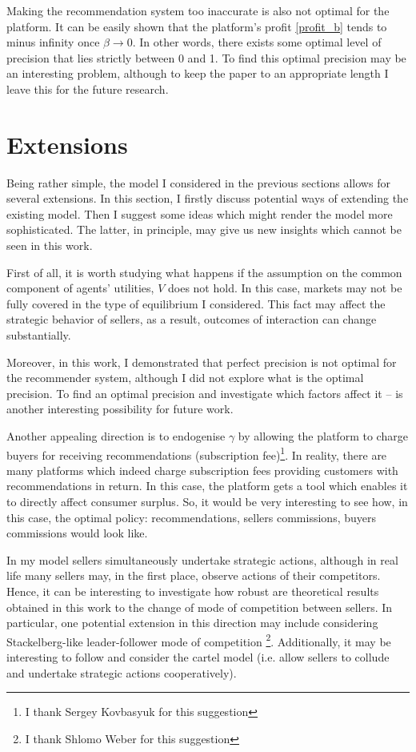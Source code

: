 \documentclass[a4paper]{article}
\begin{document}
Making the recommendation system too inaccurate is also not optimal for the platform. It can be easily shown that the platform's profit \eqref{profit_b} tends to minus infinity once $\beta \to 0$. In other words, there exists some optimal level of precision that lies strictly between 0 and 1. To find this optimal precision may be an interesting problem, although to keep the paper to an appropriate length I leave this for the future research.
	\section{Extensions}
	Being rather simple, the model I considered in the previous sections allows for several extensions. In this section, I firstly discuss potential ways of extending the existing model. Then I suggest some ideas which might render the model more sophisticated. The latter, in principle, may give us new insights which cannot be seen in this work.
	
	
	First of all, it is worth studying what happens if the assumption on the common component of agents' utilities, $V$ does not hold. In this case, markets may not be fully covered in the type of equilibrium I considered. This fact may affect the strategic behavior of sellers, as a result, outcomes of interaction can change substantially. 
	
	
	Moreover, in this work, I demonstrated that perfect precision is not optimal for the recommender system, although I did not explore what is the optimal precision. To find an optimal precision and investigate which factors affect it -- is another interesting possibility for future work.
	
	
	Another appealing direction is to endogenise $\gamma$ by allowing the platform to charge buyers for receiving recommendations (subscription fee)\footnote{I thank Sergey Kovbasyuk for this suggestion}. In reality,  there are many platforms which indeed charge subscription fees providing customers with recommendations in return. In this case, the platform gets a tool which enables it to directly affect consumer surplus. So, it would be very interesting to see how, in this case, the optimal policy: recommendations, sellers commissions, buyers commissions would look like.
	
	
	
	In my model sellers simultaneously undertake strategic actions, although in real life many sellers may, in the first place, observe actions of their competitors. Hence, it can be interesting to investigate how robust are theoretical results obtained in this work to the change of mode of competition between sellers. In particular, one potential extension in this direction may include considering Stackelberg-like leader-follower mode of competition \footnote{I thank Shlomo Weber for this suggestion}. Additionally, it may be interesting to follow \cite{levin2009quality} and consider the cartel model (i.e. allow sellers to collude and undertake strategic actions cooperatively).
	
\end{document}
